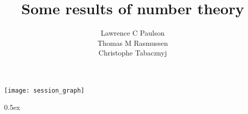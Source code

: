 \documentclass[11pt,a4paper]{article}
\begin{document}
\title{Some results of number theory}
\author{Lawrence C Paulson \\
  Thomas M Rasmussen \\
  Christophe Tabacznyj}
\maketitle

\tableofcontents

\begin{center}
  \texttt{[image: session\_graph]}  
\end{center}

\newpage

\parindent 0pt\parskip 0.5ex

\end{document}
